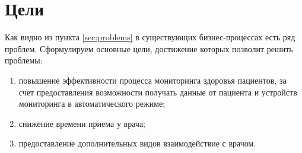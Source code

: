 \newpage
\section{Цели}
Как видно из пункта \ref{sec:problems} в существующих бизнес-процессах есть ряд
проблем. Сформулируем основные цели, достижение которых позволит решить
проблемы:

\begin{enumerate}
  \item повышение эффективности процесса мониторинга здоровья пациентов, 
  за счет предоставления возможности получать данные от пациента и устройств
  мониторинга в автоматического режиме;
  \item снижение времени приема у врача;
  \item предоставление дополнительных видов взаимодействие с врачом.
\end{enumerate}


